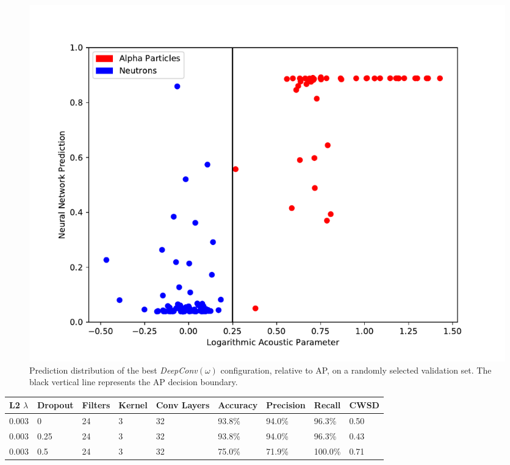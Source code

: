 \documentclass[10pt]{article}
\begin{document}
\begin{figure}[h]
    \centering
    \includegraphics[width=\textwidth]{waveform_hist}
    \caption{\label{waveform_hist} Prediction distribution of the best {\it DeepConv}$(\omega)$ configuration, relative to AP, on a randomly selected validation set. The black vertical line represents the AP decision boundary.}
\end{figure}

\begin{minipage}{\textwidth}
    \begin{center}
         \label{deepconv_table} 
        \begin{tabular}{|l|l|l|l|l|l|l|l|l|}
            \hline
            L2 $\lambda$ & Dropout & Filters & Kernel & Conv Layers & Accuracy & Precision & Recall & CWSD \\
            \hline
            0.003 & 0 & 24 & 3 & 32 & 93.8\% & 94.0\% & 96.3\% & 0.50 \\
            \hline
            0.003 & 0.25 & 24 & 3 & 32 & 93.8\% & 94.0\% & 96.3\% & 0.43 \\
            \hline
            0.003 & 0.5 & 24 & 3 & 32 & 75.0\% & 71.9\% & 100.0\% & 0.71 \\
            \hline
        \end{tabular}
    \end{center}
\end{minipage}
\end{document}

